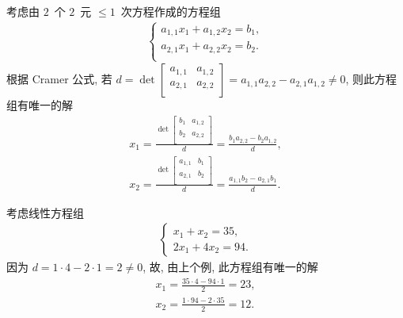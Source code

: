 \begin{example}
    考虑由 \(2\)~个 \(2\)~元 \({\leq} 1\)~次方程作成的方程组
    \begin{align*}
        \begin{cases}
            a_{1,1} x_1 + a_{1,2} x_2 = b_1, \\
            a_{2,1} x_1 + a_{2,2} x_2 = b_2. \\
        \end{cases}
    \end{align*}
    根据 Cramer 公式, 若
    \(d = \det {
        \begin{bmatrix}
            a_{1,1} & a_{1,2} \\
            a_{2,1} & a_{2,2} \\
        \end{bmatrix}
    }
    = a_{1,1} a_{2,2} - a_{2,1} a_{1,2} \neq 0\),
    则此方程组有唯一的解
    \begin{align*}
        x_1
        = \frac{\det {
                \begin{bmatrix}
                    b_{1} & a_{1,2} \\
                    b_{2} & a_{2,2} \\
                \end{bmatrix}
            }}{d}
        = \frac{b_1 a_{2,2} - b_2 a_{1,2}}{d},
        \\
        x_2
        = \frac{\det {
                \begin{bmatrix}
                    a_{1,1} & b_{1} \\
                    a_{2,1} & b_{2} \\
                \end{bmatrix}
            }}{d}
        = \frac{a_{1,1} b_2 - a_{2,1} b_1}{d}.
    \end{align*}
\end{example}

\begin{example}
    考虑线性方程组
    \begin{align*}
        \begin{cases}
            x_1 + x_2 = 35, \\
            2x_1 + 4x_2 = 94.
        \end{cases}
    \end{align*}
    因为 \(d = 1 \cdot 4 - 2 \cdot 1 = 2 \neq 0\),
    故, 由上个例,
    此方程组有唯一的解
    \begin{align*}
        x_1 = \frac{35 \cdot 4 - 94 \cdot 1}{2} = 23,
        \\
        x_2 = \frac{1 \cdot 94 - 2 \cdot 35}{2} = 12.
    \end{align*}
\end{example}

